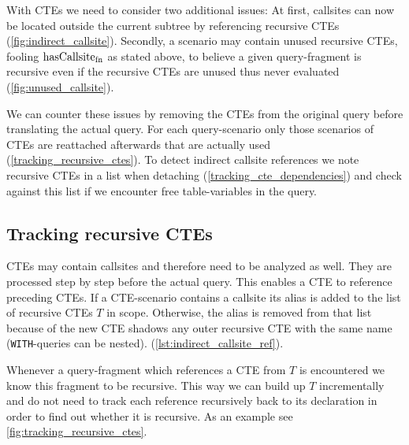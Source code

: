 With CTEs we need to consider two additional issues: At first, callsites can now be located outside the current subtree by referencing recursive CTEs (\autoref{fig:indirect_callsite}). Secondly, a scenario may contain unused recursive CTEs, fooling $\operatorname{\text{hasCallsite}_{fn}}$ as stated above, to believe a given query-fragment is recursive even if the recursive CTEs are unused thus never evaluated (\autoref{fig:unused_callsite}).

We can counter these issues by removing the CTEs from the original query before translating the actual query. For each query-scenario only those scenarios of CTEs are reattached afterwards that are actually used (\autoref{tracking_recursive_ctes}). To detect indirect callsite references we note recursive CTEs in a list when detaching (\autoref{tracking_cte_dependencies}) and check against this list if we encounter free table-variables in the query.

\subsection{Tracking recursive CTEs}\label{tracking_recursive_ctes}

CTEs may contain callsites and therefore need to be analyzed as well. They are processed step by step before the actual query. This enables a CTE to reference preceding CTEs. If a CTE-scenario contains a callsite its alias is added to the list of recursive CTEs $T$ in scope. Otherwise, the alias is removed from that list because of the new CTE shadows any outer recursive CTE with the same name (\texttt{WITH}-queries can be nested). (\autoref{lst:indirect_callsite_ref}).

Whenever a query-fragment which references a CTE from $T$ is encountered we know this fragment to be recursive. This way we can build up $T$ incrementally and do not need to track each reference recursively back to its declaration in order to find out whether it is recursive. As an example see \autoref{fig:tracking_recursive_ctes}.

